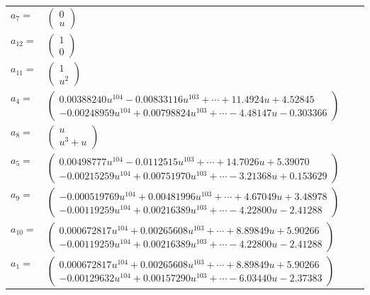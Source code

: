 \documentclass[1p]{elsarticle_modified}
\theoremstyle{definition}
\begin{document}
\begin{tabular}{m{7pt} m{180pt} m{7pt} m{180pt} }
\flushright $a_{7}=$&$\begin{pmatrix}0\\u\end{pmatrix}$ \\
\flushright $a_{12}=$&$\begin{pmatrix}1\\0\end{pmatrix}$ \\
\flushright $a_{11}=$&$\begin{pmatrix}1\\u^2\end{pmatrix}$ \\
\flushright $a_{4}=$&$\begin{pmatrix}0.00388240 u^{104}-0.00833116 u^{103}+\cdots+11.4924 u+4.52845\\-0.00248959 u^{104}+0.00798824 u^{103}+\cdots-4.48147 u-0.303366\end{pmatrix}$ \\
\flushright $a_{8}=$&$\begin{pmatrix}u\\u^3+u\end{pmatrix}$ \\
\flushright $a_{5}=$&$\begin{pmatrix}0.00498777 u^{104}-0.0112515 u^{103}+\cdots+14.7026 u+5.39070\\-0.00215259 u^{104}+0.00751970 u^{103}+\cdots-3.21368 u+0.153629\end{pmatrix}$ \\
\flushright $a_{9}=$&$\begin{pmatrix}-0.000519769 u^{104}+0.00481996 u^{103}+\cdots+4.67049 u+3.48978\\-0.00119259 u^{104}+0.00216389 u^{103}+\cdots-4.22800 u-2.41288\end{pmatrix}$ \\
\flushright $a_{10}=$&$\begin{pmatrix}0.000672817 u^{104}+0.00265608 u^{103}+\cdots+8.89849 u+5.90266\\-0.00119259 u^{104}+0.00216389 u^{103}+\cdots-4.22800 u-2.41288\end{pmatrix}$ \\
\flushright $a_{1}=$&$\begin{pmatrix}0.000672817 u^{104}+0.00265608 u^{103}+\cdots+8.89849 u+5.90266\\-0.00129632 u^{104}+0.00157290 u^{103}+\cdots-6.03440 u-2.37383\end{pmatrix}$ \\

\end{tabular}
\end{document}
